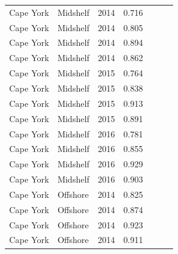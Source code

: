 \begin{longtable}{llccccc}
  Cape York & Midshelf & 2014 & 0.716 & \cellcolor[HTML]{B0D235}{B} & \cellcolor[HTML]{B0D235}{B} & \cellcolor[HTML]{B0D235}{B} \\ 
  Cape York & Midshelf & 2014 & 0.805 & \cellcolor[HTML]{B0D235}{B} & \cellcolor[HTML]{00734D}{A} & \cellcolor[HTML]{B0D235}{B} \\ 
  Cape York & Midshelf & 2014 & 0.894 & \cellcolor[HTML]{00734D}{A} & \cellcolor[HTML]{00734D}{A} & \cellcolor[HTML]{00734D}{A} \\ 
  Cape York & Midshelf & 2014 & 0.862 & \cellcolor[HTML]{00734D}{A} & \cellcolor[HTML]{00734D}{A} & \cellcolor[HTML]{00734D}{A} \\ 
  Cape York & Midshelf & 2015 & 0.764 & \cellcolor[HTML]{B0D235}{B} & \cellcolor[HTML]{B0D235}{B} & \cellcolor[HTML]{B0D235}{B} \\ 
  Cape York & Midshelf & 2015 & 0.838 & \cellcolor[HTML]{00734D}{A} & \cellcolor[HTML]{00734D}{A} & \cellcolor[HTML]{B0D235}{B} \\ 
  Cape York & Midshelf & 2015 & 0.913 & \cellcolor[HTML]{00734D}{A} & \cellcolor[HTML]{00734D}{A} & \cellcolor[HTML]{00734D}{A} \\ 
  Cape York & Midshelf & 2015 & 0.891 & \cellcolor[HTML]{00734D}{A} & \cellcolor[HTML]{00734D}{A} & \cellcolor[HTML]{00734D}{A} \\ 
  Cape York & Midshelf & 2016 & 0.781 & \cellcolor[HTML]{B0D235}{B} & \cellcolor[HTML]{B0D235}{B} & \cellcolor[HTML]{B0D235}{B} \\ 
  Cape York & Midshelf & 2016 & 0.855 & \cellcolor[HTML]{00734D}{A} & \cellcolor[HTML]{00734D}{A} & \cellcolor[HTML]{00734D}{A} \\ 
  Cape York & Midshelf & 2016 & 0.929 & \cellcolor[HTML]{00734D}{A} & \cellcolor[HTML]{00734D}{A} & \cellcolor[HTML]{00734D}{A} \\ 
  Cape York & Midshelf & 2016 & 0.903 & \cellcolor[HTML]{00734D}{A} & \cellcolor[HTML]{00734D}{A} & \cellcolor[HTML]{00734D}{A} \\ 
  Cape York & Offshore & 2014 & 0.825 & \cellcolor[HTML]{B0D235}{B} & \cellcolor[HTML]{00734D}{A} & \cellcolor[HTML]{B0D235}{B} \\ 
  Cape York & Offshore & 2014 & 0.874 & \cellcolor[HTML]{00734D}{A} & \cellcolor[HTML]{00734D}{A} & \cellcolor[HTML]{00734D}{A} \\ 
  Cape York & Offshore & 2014 & 0.923 & \cellcolor[HTML]{00734D}{A} & \cellcolor[HTML]{00734D}{A} & \cellcolor[HTML]{00734D}{A} \\ 
  Cape York & Offshore & 2014 & 0.911 & \cellcolor[HTML]{00734D}{A} & \cellcolor[HTML]{00734D}{A} & \cellcolor[HTML]{00734D}{A} \\ 

\end{longtable}
